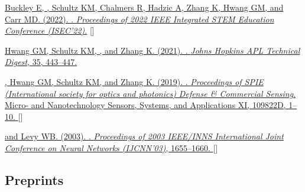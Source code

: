 \begin{description}
  \item \href{https://jdmonaco.com/files/buckley-2022-ISEC-author.pdf} {Buckley
      E, , Schultz KM, Chalmers R, Hadzic A, Zhang K, Hwang GM,
      and Carr MD. (2022). . \emph{Proceedings
    of 2022 IEEE Integrated STEM Education Conference (ISEC'22)}.}
    []
  \item \href{https://www.jhuapl.edu/Content/techdigest/pdf/V35-N04/35-04-Hwang.pdf}
    {Hwang GM, Schultz KM, , and Zhang K. (2021).
      . \emph{Johns Hopkins
    APL Technical Digest}, 35, 443--447.}
  \item \href{https://dx.doi.org/10.1117/12.2518966}
    {, Hwang GM, Schultz KM, and Zhang K. (2019).
      . \emph{Proceedings of SPIE (International society
      for optics and photonics) Defense \& Commercial Sensing}. Micro- and
      Nanotechnology Sensors, Systems, and Applications XI, 109822D, 1--10.
    }
    [\href{https://jdmonaco.com/files/monaco-SPIE2019-cognitive-swarming.pdf}{}]
  \item \href{https://dx.doi.org/10.1109/IJCNN.2003.1223655}
      { and Levy WB. (2003). . \emph{Proceedings of 2003 IEEE/INNS
        International Joint Conference on Neural Networks (IJCNN'03)}, 1655--1660.
      }
      [\href{https://jdmonaco.com/files/monaco-2003-tmaze.pdf}{}]
\end{description}

\renewcommand{\itemnote}[1]{}

\subsection*{Preprints}
\label{sec:preprints}

